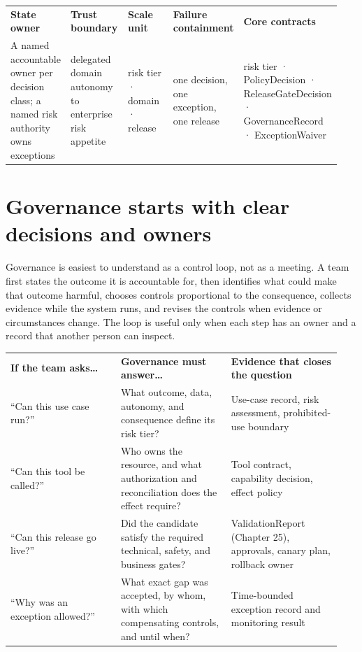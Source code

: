 \BookTableStart
\fontsize{7.2}{9}\selectfont
\begin{tabular}{@{}Y{0.1880\linewidth}Y{0.1880\linewidth}Y{0.1880\linewidth}Y{0.1880\linewidth}Y{0.1880\linewidth}@{}}
\color{white}\bfseries \textbf{State owner} & \color{white}\bfseries \textbf{Trust boundary} & \color{white}\bfseries \textbf{Scale unit} & \color{white}\bfseries \textbf{Failure containment} & \color{white}\bfseries \textbf{Core contracts} \\
A named accountable owner per decision class; a named risk authority owns exceptions & delegated domain autonomy to enterprise risk appetite & risk tier · domain · release & one decision, one exception, one release & risk tier · PolicyDecision · ReleaseGateDecision · GovernanceRecord · ExceptionWaiver \\
\end{tabular}
\BookTableEnd

\section{Governance starts with clear decisions and owners}

Governance is easiest to understand as a control loop, not as a meeting. A team first states the outcome it is accountable for, then identifies what could make that outcome harmful, chooses controls proportional to the consequence, collects evidence while the system runs, and revises the controls when evidence or circumstances change. The loop is useful only when each step has an owner and a record that another person can inspect.\par

\BookTableStart
\small
\begin{tabular}{@{}Y{0.3133\linewidth}Y{0.3133\linewidth}Y{0.3133\linewidth}@{}}
\color{white}\bfseries \textbf{If the team asks…} & \color{white}\bfseries \textbf{Governance must answer…} & \color{white}\bfseries \textbf{Evidence that closes the question} \\
“Can this use case run?” & What outcome, data, autonomy, and consequence define its risk tier? & Use-case record, risk assessment, prohibited-use boundary \\
“Can this tool be called?” & Who owns the resource, and what authorization and reconciliation does the effect require? & Tool contract, capability decision, effect policy \\
“Can this release go live?” & Did the candidate satisfy the required technical, safety, and business gates? & ValidationReport (Chapter 25), approvals, canary plan, rollback owner \\
“Why was an exception allowed?” & What exact gap was accepted, by whom, with which compensating controls, and until when? & Time-bounded exception record and monitoring result \\
\end{tabular}
\BookTableEnd

